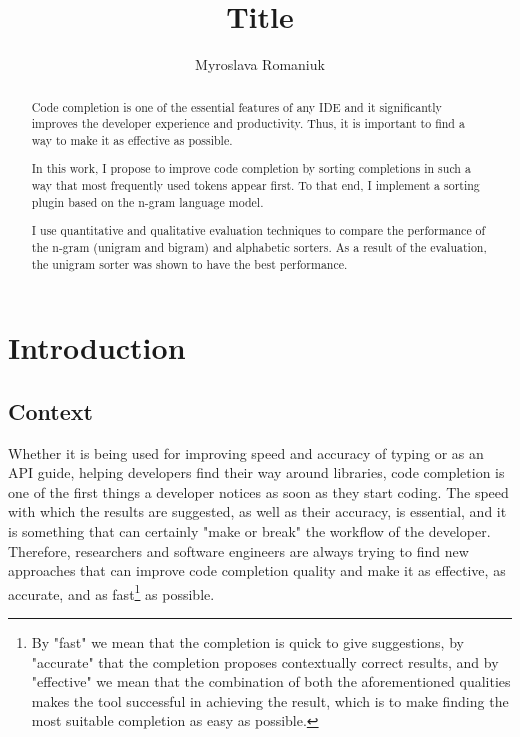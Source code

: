 \documentclass[sigplan,screen]{acmart}
\begin{document}
\title{Title}
\author{Myroslava Romaniuk}
\begin{abstract}
Code completion is one of the essential features of any IDE and it significantly improves the developer experience and productivity. Thus, it is important to find a way to make it as effective as possible.

In this work, I propose to improve code completion by sorting completions in such a way that most frequently used tokens appear first. To that end, I implement a sorting plugin based on the n-gram language model.

I use quantitative and qualitative evaluation techniques to compare the performance of the n-gram (unigram and bigram) and alphabetic sorters. As a result of the evaluation, the unigram sorter was shown to have the best performance.
\end{abstract}

\maketitle

\section{Introduction}
\subsection{Context}
Whether it is being used for improving speed and accuracy of typing or as an API guide, helping developers find their way around libraries, code completion is one of the first things a developer notices as soon as they start coding. The speed with which the results are suggested, as well as their accuracy, is essential, and it is something that can certainly "make or break" the workflow of the developer. Therefore, researchers and software engineers are always trying to find new approaches that can improve code completion quality and make it as effective, as accurate, and as fast\footnote{By "fast" we mean that the completion is quick to give suggestions, by "accurate" that the completion proposes contextually correct results, and by "effective" we mean that the combination of both the aforementioned qualities makes the tool successful in achieving the result, which is to make finding the most suitable completion as easy as possible.} as possible.
\end{document}
